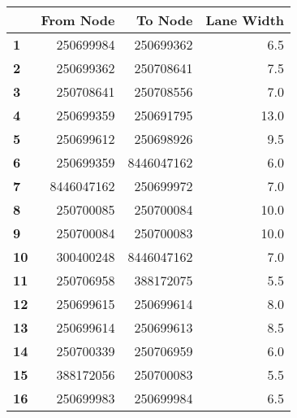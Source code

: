 \begin{tabular}{lrrr}
\toprule
{} &   From Node &     To Node &  Lane Width \\
\midrule
\textbf{1 } &   250699984 &   250699362 &         6.5 \\
\textbf{2 } &   250699362 &   250708641 &         7.5 \\
\textbf{3 } &   250708641 &   250708556 &         7.0 \\
\textbf{4 } &   250699359 &   250691795 &        13.0 \\
\textbf{5 } &   250699612 &   250698926 &         9.5 \\
\textbf{6 } &   250699359 &  8446047162 &         6.0 \\
\textbf{7 } &  8446047162 &   250699972 &         7.0 \\
\textbf{8 } &   250700085 &   250700084 &        10.0 \\
\textbf{9 } &   250700084 &   250700083 &        10.0 \\
\textbf{10} &   300400248 &  8446047162 &         7.0 \\
\textbf{11} &   250706958 &   388172075 &         5.5 \\
\textbf{12} &   250699615 &   250699614 &         8.0 \\
\textbf{13} &   250699614 &   250699613 &         8.5 \\
\textbf{14} &   250700339 &   250706959 &         6.0 \\
\textbf{15} &   388172056 &   250700083 &         5.5 \\
\textbf{16} &   250699983 &   250699984 &         6.5 \\
\bottomrule
\end{tabular}
